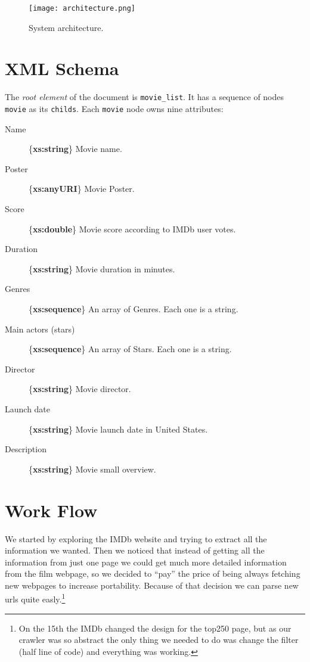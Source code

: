 \documentclass[12pt]{article}
\begin{document}
\begin{figure}[h!]
	\centering
	\texttt{[image: architecture.png]}
	\caption{System architecture.}
\end{figure}

\clearpage
\section{XML Schema}
\indent \indent The \emph{root element} of the document is \texttt{movie\_list}. It has a sequence of nodes \texttt{movie} as its \texttt{childs}.
Each \texttt{movie} node owns nine attributes:
\begin{description}
	\item [Name] \{\textbf{xs:string}\}
		Movie name.
	\item [Poster] \{\textbf{xs:anyURI}\}
		Movie Poster.
	\item [Score] \{\textbf{xs:double}\}
		Movie score according to IMDb user votes.
	\item [Duration] \{\textbf{xs:string}\}
		Movie duration in minutes.
	\item [Genres] \{\textbf{xs:sequence}\}
		An array of Genres. Each one is a string.
	\item [Main actors (stars)] \{\textbf{xs:sequence}\}
		An array of Stars. Each one is a string.
	\item [Director] \{\textbf{xs:string}\}
		Movie director.
	\item [Launch date] \{\textbf{xs:string}\}
		Movie launch date in United States.
	\item [Description] \{\textbf{xs:string}\}
		Movie small overview.
\end{description}

\clearpage
\section{Work Flow}
\indent \indent We started by exploring the IMDb website and trying to extract all the information we wanted. Then we noticed that instead of getting all the information from just one page we could get much more detailed information from the film webpage, so we decided to ``pay'' the price of being always fetching new webpages to increase portability. Because of that decision we can parse new urls quite easly.\footnote{On the 15th the IMDb changed the design for the top250 page, but as our crawler was so abstract the only thing we needed to do was change the filter (half line of code) and everything was working.}
\end{document}
